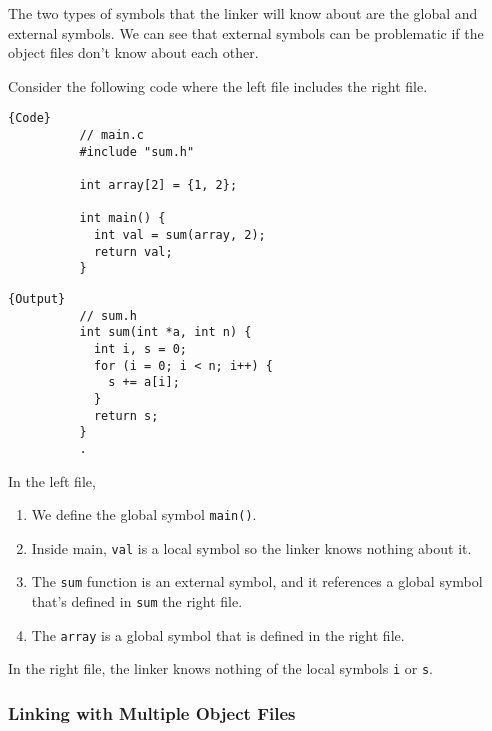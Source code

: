       The two types of symbols that the linker will know about are the global and external symbols. We can see that external symbols can be problematic if the object files don't know about each other. 

      \begin{example}
        Consider the following code where the left file includes the right file. 

        \noindent\begin{minipage}{.5\textwidth}
        \begin{lstlisting}[]{Code}
          // main.c 
          #include "sum.h" 

          int array[2] = {1, 2}; 

          int main() {
            int val = sum(array, 2); 
            return val; 
          }
        \end{lstlisting}
        \end{minipage}
        \hfill
        \begin{minipage}{.49\textwidth}
        \begin{lstlisting}[]{Output}
          // sum.h 
          int sum(int *a, int n) {
            int i, s = 0; 
            for (i = 0; i < n; i++) {
              s += a[i]; 
            }
            return s; 
          }
          .
        \end{lstlisting}
        \end{minipage}
        In the left file, 
        \begin{enumerate}
          \item We define the global symbol \texttt{main()}. 
          \item Inside main, \texttt{val} is a local symbol so the linker knows nothing about it. 
          \item The \texttt{sum} function is an external symbol, and it references a global symbol that's defined in \texttt{sum} the right file. 
          \item The \texttt{array} is a global symbol that is defined in the right file. 
        \end{enumerate}
        In the right file, the linker knows nothing of the local symbols \texttt{i} or \texttt{s}. 
      \end{example}

    \subsubsection{Linking with Multiple Object Files}

